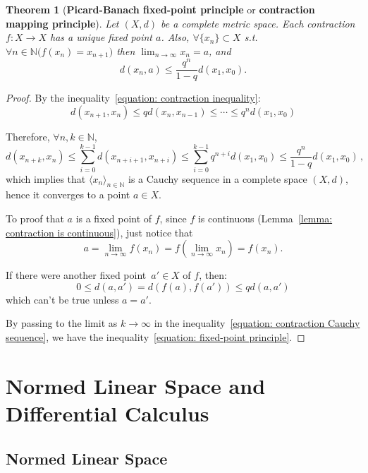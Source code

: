 \documentclass[openany]{book}
\theoremstyle{plain}
\newtheorem{theorem}{Theorem}[section] %
\theoremstyle{definition}
\begin{document}
\begin{theorem}[\textbf{Picard-Banach fixed-point principle} or \textbf{contraction mapping principle}]
		\label{contraction_mapping_principle}%
	Let $(X, d)$ be a complete metric space. 
	Each contraction $f \colon X \to X$ has a unique fixed point $a$. 
	Also, $\forall \{x_n\} \subset X$ s.t.\ 
	$\forall n \in \mathbb{N} \big(f (x_n) = x_{n+1} \big)$ then $\lim_{n\to \infty} x_n = a$, and
	\begin{equation}\label{equation: fixed-point principle}
		d(x_n, a) \leq \frac{q^n}{1 - q} d(x_1, x_0).
\end{equation}
\end{theorem}
\begin{proof}
	By the inequality~\ref{equation: contraction inequality}:
	\[
		d(x_{n+1}, x_n) \leq q d(x_n, x_{n-1})
		\leq \cdots 
		\leq q^n d(x_1, x_0)
	\]

	Therefore, $\forall n, k \in \mathbb{N}$, 
	\begin{equation}\label{equation: contraction Cauchy sequence}
		d(x_{n+k}, x_n) \leq 
			\sum^{k-1}_{i=0} d(x_{n+i+1}, x_{n+i}) \leq
			\sum^{k-1}_{i=0} q^{n+i} d(x_1, x_0) \leq
			\frac{q^n}{1 - q} d(x_1, x_0) \,,
	\end{equation}
	which implies that $\langle x_n \rangle_{n \in \mathbb N}$ is a Cauchy sequence in a complete space $(X, d)$, hence it converges to a point $a \in X$.

	To proof that $a$ is a fixed point of $f$, since $f$ is continuous (Lemma~\ref{lemma: contraction is continuous}), just notice that 
	\[
		a = \lim_{n \to \infty} f(x_n) 
			= f(\lim_{n\to \infty} x_n) = f(x_n).
	\]

	If there were another fixed point~$a' \in X$ of $f$, then:
	\[
		0 \leq d(a, a')  = d(f(a), f(a')) \leq q d(a, a')
	\]
	which can't be true unless $a = a'$. 

	By passing to the limit as $k \to \infty$ in the inequality~\ref{equation: contraction Cauchy sequence}, we have the inequality~\ref{equation: fixed-point principle}.
\end{proof}

\chapter{Normed Linear Space and Differential Calculus}
\section{Normed Linear Space} \
\end{document}
